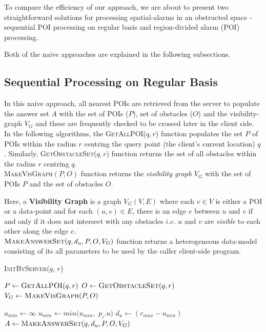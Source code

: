 \documentclass{sig-alternate}
\begin{document}
To compare the efficiency of our approach, we are about to present two straightforward solutions for processing spatial-alarms in an obstructed space - sequential POI processing on regular basis and region-divided alarm (POI) processing. 

Both of the naive approaches are explained in the following subsections.


\subsection{Sequential Processing on Regular Basis}
In this naive approach, all nearest POIs are retrieved from the server to populate the answer set $A$ with the set of POIs ($P$), set of obstacles ($O$) and the visibility-graph $V_G$ and these are frequently checked to be crossed later in the client side.\\

In the following algorithms, the \textsc{GetAllPOI}($q, r$) function populates the set $P$ of POIs within the radius $r$ centring the query point (the client's current location) $q$. Similarly, \textsc{GetObstacleSet}($q, r$) function returns the set of all obstacles within the radius $r$ centring $q$.\\

\textsc{MakeVisGraph}$(P,O)$ function returns the \textit{visibility graph} $V_G$ with the set of POIs $P$ and the set of obstacles $O$.

Here, a \textbf{Visibility Graph} is a graph $V_G(V,E)$ where each $v \in V$ is either a POI or a data-point and for each $(u,v) \in E$, there is an edge $e$ between $u$ and $v$ if and only if it does not intersect with any obstacles $i.e.$ $u$ and $v$ are \textit{visible} to each other along the edge $e$.\\

$\textsc{MakeAnswerSet}(q, d_u, P, O, V_G)$ function returns a heterogeneous data-model consisting of its all parameters to be used by the caller client-side program.

\DontPrintSemicolon
\begin{algorithm}
\caption{\textsc{InitByServer}($q$, $r$)}
	
	 $P \gets \textsc{GetAllPOI}(q, r)$ \;
	 $O \gets \textsc{GetObstacleSet}(q, r)$ \;
	 $V_G \gets \textsc{MakeVisGraph}(P, O)$ \;
	 
	 $u_{min} \gets \infty$\;
	 {
		 $u_{min} \gets min( u_{min},$ $p_i.u )$ \; 
	}
	$d_u \gets (r_{max} - u_{min})$ \\
	\Return $A \gets \textsc{MakeAnswerSet}(q, d_u, P, O, V_G)$ \;
\label{InitByServer}
\end{algorithm}
\end{document}

